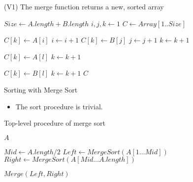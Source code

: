 \documentclass{beamer}
\begin{document}
\begin{frame}
\begin{block}{(V1) The merge function returns a new, sorted array}
\begin{scriptsize}
    \begin{algorithmic}
       \State $Size \gets A.length + B.length$ 
       \State $i, j, k \gets 1$  
       \State $C \gets Array[1 .. Size]$ 

           \State $C[k] \gets A[i]$
           \State $i \gets i + 1$
         \Else
           \State $C[k] \gets B[j]$
           \State $j \gets j + 1$
         \EndIf
         \State $k \gets k + 1$  
       \EndWhile
         
         \State $C[k] \gets A[l]$
         \State $k \gets k + 1$
       \EndFor

        \State $C[k] \gets B[l]$
        \State $k \gets k + 1$
       \EndFor 
        $C$
    \EndProcedure
    \end{algorithmic}
\end{scriptsize}
\end{block}
\end{frame}

\begin{frame}{Sorting with Merge Sort}

  \begin{itemize}
    \item The sort procedure is trivial. 
  \end{itemize}

  \pause

  \begin{block}{Top-level procedure of merge sort}
    \begin{scriptsize}
    \begin{algorithmic}
          $A$
        \EndIf

        \State $Mid \gets A.length / 2$
        \State $Left  \gets MergeSort(A[1 \ldots Mid])$
        \State $Right \gets MergeSort(A[Mid \ldots A.length])$

         $Merge(Left, Right)$ 
      \EndProcedure
    \end{algorithmic}
    \end{scriptsize}
  \end{block}   
\end{frame}
\end{document}
